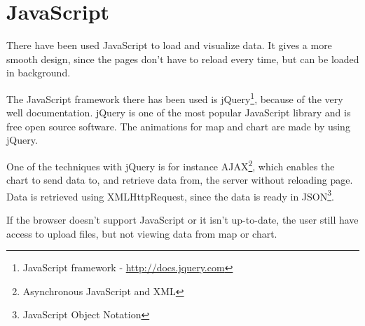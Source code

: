 \chapter{JavaScript}
There have been used JavaScript to load and visualize data. It gives a more smooth design, since the pages don't have to reload every time, but can be loaded in background.

The JavaScript framework there has been used is jQuery\footnote{JavaScript framework - \url{http://docs.jquery.com}}, because of the very well documentation. jQuery is one of the most popular JavaScript library and is free open source software. The animations for map and chart are made by using jQuery.
 
One of the techniques with jQuery is for instance AJAX\footnote{Asynchronous JavaScript and XML}, which enables the chart to send data to, and retrieve data from, the server without reloading page. Data is retrieved using XMLHttpRequest, since the data is ready in JSON\footnote{JavaScript Object Notation}.

If the browser doesn't support JavaScript or it isn't up-to-date, the user still have access to upload files, but not viewing data from map or chart.